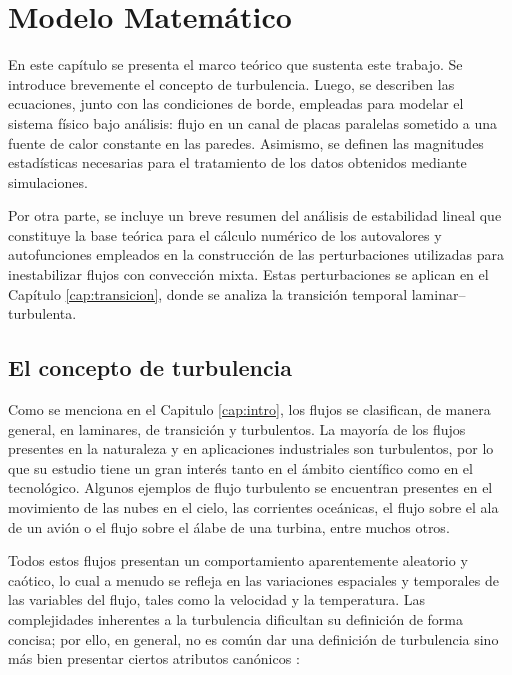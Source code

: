 \chapter{Modelo Matemático} \label{cap:modelo}

En este capítulo se presenta el marco teórico que sustenta este trabajo. Se introduce brevemente el concepto de turbulencia. Luego, se describen las ecuaciones, junto con las condiciones de borde, empleadas para modelar el sistema físico bajo análisis: flujo en un canal de placas paralelas sometido a una fuente de calor constante en las paredes. Asimismo, se definen las magnitudes estadísticas necesarias para el tratamiento de los datos obtenidos mediante simulaciones.

Por otra parte, se incluye un breve resumen del análisis de estabilidad lineal que constituye la base teórica para el cálculo numérico de los autovalores y autofunciones empleados en la construcción de las perturbaciones utilizadas para inestabilizar flujos con convección mixta. Estas perturbaciones se aplican en el Capítulo \ref{cap:transicion}, donde se analiza la transición temporal laminar–turbulenta.

\section{El concepto de turbulencia}%

Como se menciona en el Capitulo \ref{cap:intro}, los flujos se clasifican, de manera general, en laminares, de transición y turbulentos. La mayoría de los flujos presentes en la naturaleza y en aplicaciones industriales son turbulentos, por lo que su estudio tiene un gran interés tanto en el ámbito científico como en el tecnológico. Algunos ejemplos de flujo turbulento se encuentran presentes en el movimiento de las nubes en el cielo, las corrientes oceánicas, el flujo sobre el ala de un avión o el flujo sobre el álabe de una turbina, entre muchos otros.

Todos estos flujos presentan un comportamiento aparentemente aleatorio y caótico, lo cual a menudo se refleja en las variaciones espaciales y temporales de las variables del flujo, tales como la velocidad y la temperatura. Las complejidades inherentes a la turbulencia dificultan su definición de forma concisa; por ello, en general, no es común dar una definición de turbulencia sino más bien presentar ciertos atributos canónicos \cite{smits2009lectures}:

